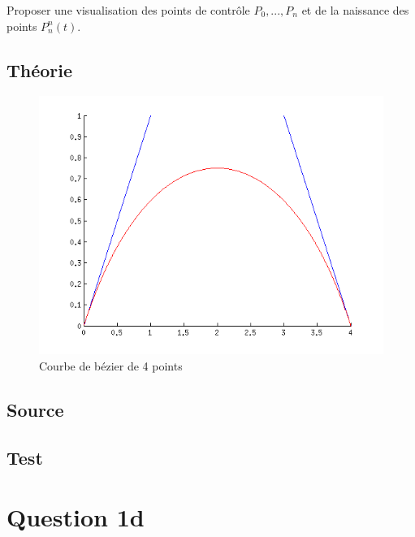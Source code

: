\documentclass[a4paper,10pt]{report}
\begin{document}
Proposer une visualisation des points de contrôle $P_{0} , ..., P_{n}$ et de la naissance des points $P_{n}^{n}(t)$. 

\subsection*{Théorie}

\begin{figure}[h]
	\begin{center}
		\includegraphics[scale=0.8]{visualiseCastle}
		\caption{Courbe de bézier de 4 points}
	\end{center}
\end{figure}


\subsection*{Source}

\begin{center}
	
\end{center}

\subsection*{Test}

\newpage
\section*{Question 1d}
\end{document}
